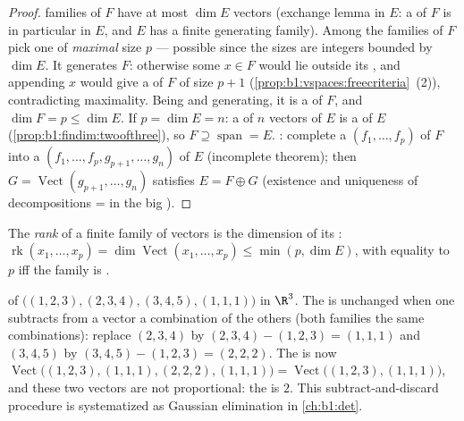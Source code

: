 \begin{proof}
 families of $F$ have at most $\dim E$ vectors (exchange lemma
in $E$: a  of $F$ is in particular  in $E$, and $E$
has a finite generating family). Among the  families of $F$
pick one of \emph{maximal} size $p$ --- possible since the sizes
are integers bounded by $\dim E$. It generates $F$: otherwise some
$x \in F$ would lie outside its , and appending $x$ would give
a  of $F$ of size $p + 1$
(\cref{prop:b1:vspaces:freecriteria}~(2)), contradicting
maximality. Being  and generating, it is a  of $F$, and
$\dim F = p \leq \dim E$. If $p = \dim E = n$: a  of $n$ vectors of
$E$ is a  of $E$ (\cref{prop:b1:findim:twoofthree}), so $F
\supseteq \operatorname{span} = E$. : complete a 
$(f_1, \dots, f_p)$ of $F$ into a  $(f_1, \dots, f_p, g_{p+1},
\dots, g_n)$ of $E$ (incomplete  theorem); then $G =
\operatorname{Vect}(g_{p+1}, \dots, g_n)$ satisfies $E = F \oplus G$
(existence and uniqueness of decompositions =  in the
big ).
\end{proof}

\begin{definition}\label{def:b1:findim:rank}
The \emph{rank} of a finite family of
vectors is the dimension of its :
$\operatorname{rk}(x_1, \dots, x_p) = \dim
\operatorname{Vect}(x_1, \dots, x_p) \leq \min(p, \dim E)$,
with equality to $p$ iff the family is .
\end{definition}

\begin{example}
\label{ex:b1:findim:rankcomputation}
 of $\bigl((1,2,3), (2,3,4), (3,4,5), (1,1,1)\bigr)$ in
$\R^3$. The  is unchanged when one subtracts from a vector a
combination of the others (both families  the same
combinations): replace $(2,3,4)$ by $(2,3,4) - (1,2,3) = (1,1,1)$
and $(3,4,5)$ by $(3,4,5) - (1,2,3) = (2,2,2)$. The  is now
$\operatorname{Vect}\bigl((1,2,3), (1,1,1), (2,2,2),
(1,1,1)\bigr) = \operatorname{Vect}\bigl((1,2,3), (1,1,1)\bigr)$,
and these two vectors are not proportional: the  is $2$. This
subtract-and-discard procedure is systematized as Gaussian
elimination in \cref{ch:b1:det}.
\end{example}


